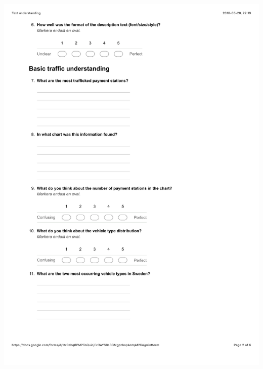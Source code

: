 \documentclass[12pt]{kththesis}
\begin{document}
\begin{appendices}
\includegraphics[width=1\textwidth]{TextUnderstanding2.pdf}
\newpage

\end{appendices}
\end{document}
